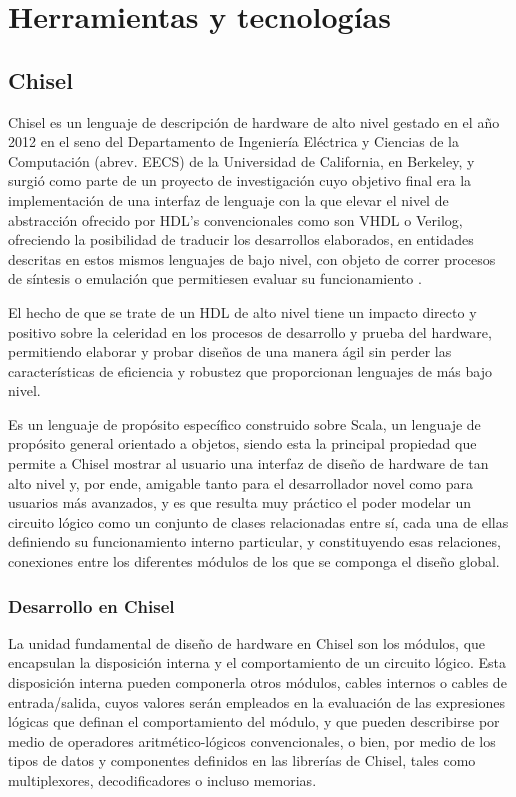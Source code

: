 \chapter{Herramientas y tecnologías}


\section{Chisel}

Chisel es un lenguaje de descripción de hardware de alto nivel gestado en el año 2012 en el seno del Departamento de Ingeniería Eléctrica y Ciencias de la Computación (abrev. EECS) de la Universidad de California, en Berkeley, y surgió como parte de un proyecto de investigación cuyo objetivo final era la implementación de una interfaz de lenguaje con la que elevar el nivel de abstracción ofrecido por HDL's convencionales como son VHDL o Verilog, ofreciendo la posibilidad de traducir los desarrollos elaborados, en entidades descritas en estos mismos lenguajes de bajo nivel, con objeto de correr procesos de síntesis o emulación que permitiesen evaluar su funcionamiento \cite{chiselEECS}.

El hecho de que se trate de un HDL de alto nivel tiene un impacto directo y positivo sobre la celeridad en los procesos de desarrollo y prueba del hardware, permitiendo elaborar y probar diseños de una manera ágil sin perder las características de eficiencia y robustez que proporcionan lenguajes de más bajo nivel.

Es un lenguaje de propósito específico construido sobre Scala, un lenguaje de propósito general orientado a objetos, siendo esta la principal propiedad que permite a Chisel mostrar al usuario una interfaz de diseño de hardware de tan alto nivel y, por ende, amigable tanto para el desarrollador novel como para usuarios más avanzados, y es que resulta muy práctico el poder modelar un circuito lógico como un conjunto de clases relacionadas entre sí, cada una de ellas definiendo su funcionamiento interno particular, y constituyendo esas relaciones, conexiones entre los diferentes módulos de los que se componga el diseño global.

\subsection{Desarrollo en Chisel}

La unidad fundamental de diseño de hardware en Chisel son los módulos, que encapsulan la disposición interna y el comportamiento de un circuito lógico. Esta disposición interna pueden componerla otros módulos, cables internos o cables de entrada/salida, cuyos valores serán empleados en la evaluación de las expresiones lógicas que definan el comportamiento del módulo, y que pueden describirse por medio de operadores aritmético-lógicos convencionales, o bien, por medio de los tipos de datos y componentes definidos en las librerías de Chisel, tales como multiplexores, decodificadores o incluso memorias.

